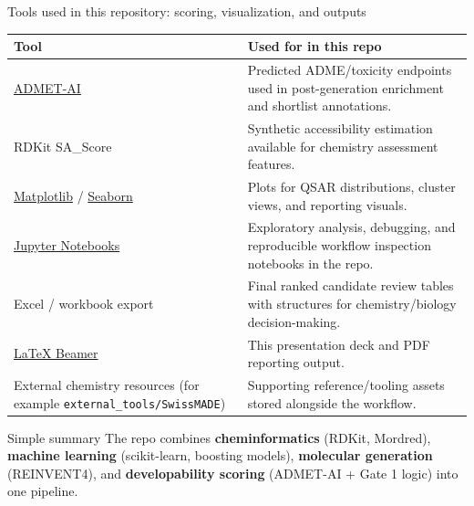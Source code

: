 \documentclass[aspectratio=169,10pt]{beamer}
\begin{document}
\begin{frame}{Tools used in this repository: scoring, visualization, and outputs}
  \scriptsize
  \begin{tabularx}{\textwidth}{lX}
    \toprule
    \textbf{Tool} & \textbf{Used for in this repo} \\
    \midrule
    \href{https://github.com/swansonk14/admet_ai}{ADMET-AI} & Predicted ADME/toxicity endpoints used in post-generation enrichment and shortlist annotations. \\
    RDKit SA\_Score & Synthetic accessibility estimation available for chemistry assessment features. \\
    \href{https://matplotlib.org/}{Matplotlib} / \href{https://seaborn.pydata.org/}{Seaborn} & Plots for QSAR distributions, cluster views, and reporting visuals. \\
    \href{https://jupyter.org/}{Jupyter Notebooks} & Exploratory analysis, debugging, and reproducible workflow inspection notebooks in the repo. \\
    Excel / workbook export & Final ranked candidate review tables with structures for chemistry/biology decision-making. \\
    \href{https://ctan.org/pkg/beamer}{LaTeX Beamer} & This presentation deck and PDF reporting output. \\
    External chemistry resources (for example \texttt{external\_tools/SwissMADE}) & Supporting reference/tooling assets stored alongside the workflow. \\
    \bottomrule
  \end{tabularx}

  \vspace{2pt}
  \begin{exampleblock}{Simple summary}
    The repo combines \textbf{cheminformatics} (RDKit, Mordred),
    \textbf{machine learning} (scikit-learn, boosting models),
    \textbf{molecular generation} (REINVENT4), and
    \textbf{developability scoring} (ADMET-AI + Gate 1 logic) into one pipeline.
  \end{exampleblock}
\end{frame}
\end{document}
